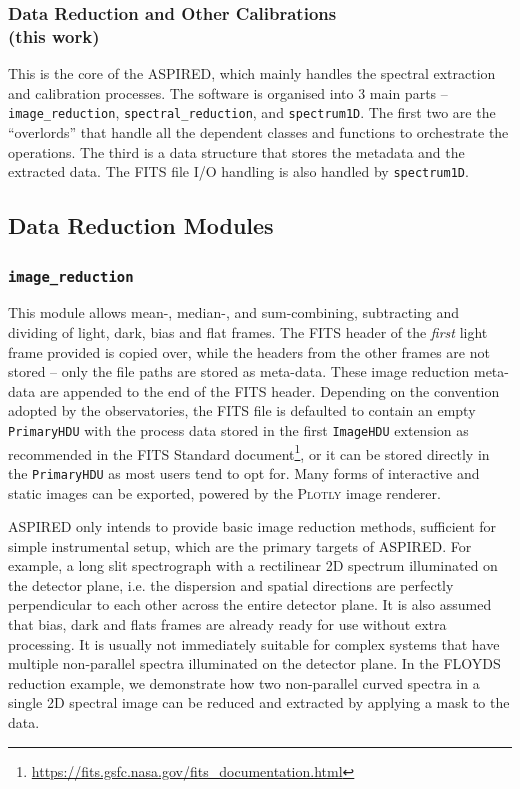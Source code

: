 \documentclass[twocolumn, linenumbers]{aastex631}
\begin{document}
\subsubsection*{Data Reduction and Other Calibrations\\(this work)}
This is the core of the \textsc{ASPIRED}, which mainly handles the spectral
extraction and calibration processes. The software is organised into
3 main parts -- \texttt{image\_reduction}, \texttt{spectral\_reduction},
and \texttt{spectrum1D}. The first two are the ``overlords'' that handle
all the dependent classes and functions to orchestrate the operations.
The third is a data structure that stores the metadata and the extracted
data. The FITS file I/O handling is also handled by \texttt{spectrum1D}.


\subsection{Data Reduction Modules}

\subsubsection{\texttt{image\_reduction}}
This module allows mean-, median-, and sum-combining, subtracting and dividing of light,
dark, bias and flat frames. The FITS header of the \textit{first} light frame provided
is copied over, while the headers from the other frames are not stored -- only
the file paths are stored as meta-data. These image reduction meta-data
are appended to the end of the FITS header. Depending on the convention
adopted by the observatories, the FITS file is defaulted to contain an empty \texttt{PrimaryHDU}
with the process data stored in the first \texttt{ImageHDU} extension as
recommended in the FITS Standard 
document\footnote{\url{https://fits.gsfc.nasa.gov/fits_documentation.html}},
or it can be stored directly in the \texttt{PrimaryHDU} as most users tend
to opt for. Many forms of interactive and static images can be exported,
powered by the \textsc{Plotly} image renderer.

\textsc{ASPIRED} only intends to provide basic image reduction methods, sufficient
for simple instrumental setup, which are the primary targets of \textsc{ASPIRED}. For
example, a long slit spectrograph with a rectilinear 2D spectrum illuminated
on the detector plane, i.e. the dispersion and spatial directions are perfectly
perpendicular to each other across the entire detector plane. It is also
assumed that bias, dark and flats frames are already ready for use without
extra processing. It is usually
not immediately suitable for complex systems that have multiple non-parallel
spectra illuminated on the detector plane. In the FLOYDS reduction example,
we demonstrate how two non-parallel curved spectra in a single
2D spectral image can be reduced and extracted by applying a mask to the
data.
\end{document}
